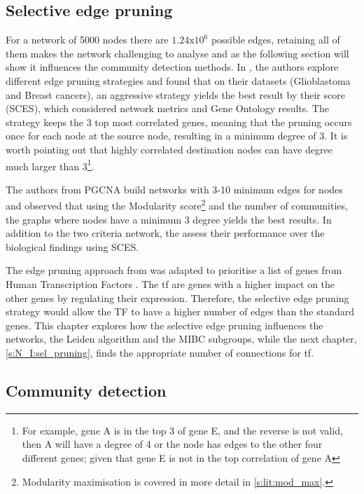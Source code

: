 \subsection{Selective edge pruning} \label{s:N_I:methods_edge_pruning}

For a network of 5000 nodes there are $1.24\text{x}10^6$ possible edges, retaining all of them makes the network challenging to analyse and as the following section will show it influences the community detection methods. In \citet{Care2019-ij}, the authors explore different edge pruning strategies and found that on their datasets (Glioblastoma and Breast cancers), an aggressive strategy yields the best result by their score (SCES), which considered network metrics and Gene Ontology results. The strategy keeps the 3 top most correlated genes, meaning that the pruning occurs once for each node at the source node, resulting in a minimum degree of 3. It is worth pointing out that highly correlated destination nodes can have degree much larger than 3\footnote{For example, gene A is in the top 3 of gene E, and the reverse is not valid, then A will have a degree of 4 or the node has edges to the other four different genes; given that gene E is not in the top correlation of gene A}. 

The authors from PGCNA build networks with 3-10 minimum edges for nodes and observed that using the Modularity score\footnote{Modularity maximisation is covered in more detail in \cref{s:lit:mod_max}.} and the number of communities, the graphs where nodes have a minimum 3 degree yields the best results. In addition to the two criteria network, the \citet{Care2019-ij} assess their performance over the biological findings using SCES.

The edge pruning approach from \citet{Care2019-ij} was adapted to prioritise a list of genes from Human Transcription Factors \citep{Lambert2018-el}. The \acrlong{tf} are genes with a higher impact on the other genes by regulating their expression. Therefore, the selective edge pruning strategy would allow the TF to have a higher number of edges than the standard genes. This chapter explores how the selective edge pruning influences the networks, the Leiden algorithm and the MIBC subgroups, while the next chapter, \cref{s:N_I:sel_pruning}, finds the appropriate number of connections for \acrshort{tf}.

\subsection{Community detection} \label{s:N_I:methods_comm_detection}


